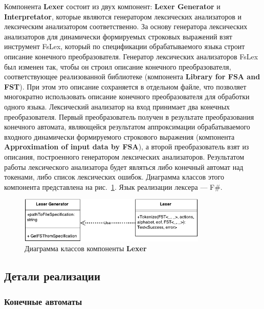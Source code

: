 Компонента \textbf{Lexer} состоит из двух компонент: \textbf{Lexer Generator} и \textbf{Interpretator}, которые являются генератором лексических анализаторов и лексическим анализатором соответственно. За основу генератора лексических анализаторов для динамически формируемых строковых выражений взят инструмент FsLex, который по спецификации обрабатываемого языка строит описание конечного преобразователя. Генератор лексических анализаторов FsLex был изменен так, чтобы он строил описание конечного преобразователя, соответствующее реализованной библиотеке (компонента \textbf{Library for FSA and FST}). При этом это описание сохраняется в отдельном файле, что позволяет многократно использовать описание конечного преобразователя для обработки одного языка. Лексический анализатор на вход принимает два конечных преобразователя. Первый преобразователь получен в результате преобразования конечного автомата, являющейся результатом аппроксимации обрабатываемого входного динамически формируемого строкового выражения (компонента \textbf{Approximation of input data by FSA}), а второй преобразователь взят из описания, построенного генератором лексических анализаторов. Результатом работы лексического анализатора будет являться либо конечный автомат над токенами, либо список лексических ошибок. Диаграмма классов этого компонента представлена на рис.~\ref{fig:ClassLexer}. Язык реализации лексера --- F\#.

\begin{figure}[H]
\begin{center}
\includegraphics[width=0.8\textwidth]{Polubelova/ClassDiagramLexer}
\caption{Диаграмма классов компоненты \textbf{Lexer}}
\label{fig:ClassLexer} 
\end{center}
\end{figure}

\subsection{Детали реализации}

\subsubsection{Конечные автоматы}

